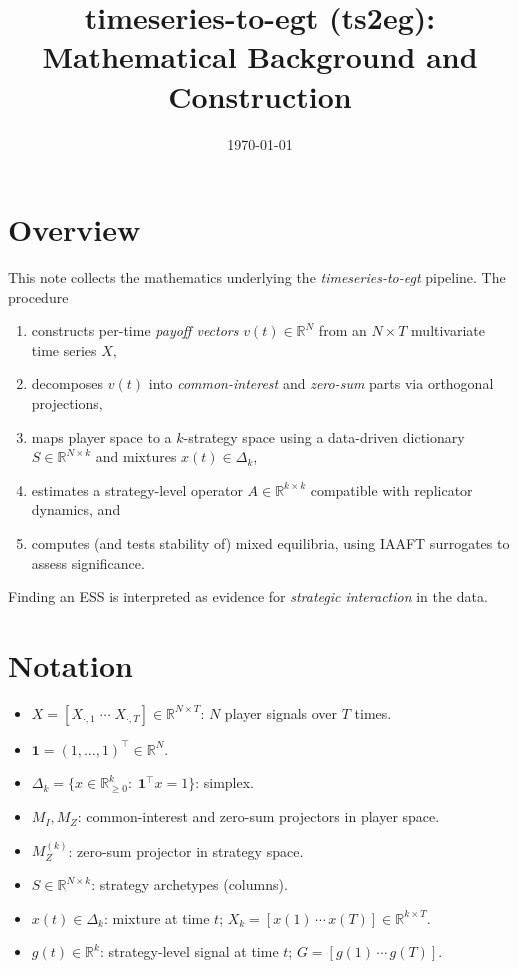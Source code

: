 \documentclass[11pt]{article}
\title{\textbf{timeseries-to-egt (ts2eg):\\
Mathematical Background and Construction}}
\author{}
\date{\today}
\newcommand{\one}{\mathbf{1}}
\newcommand{\R}{\mathbb{R}}
\begin{document}
\maketitle

\section{Overview}
This note collects the mathematics underlying the \emph{timeseries-to-egt} pipeline. The procedure
\begin{enumerate}[leftmargin=*]
    \item constructs per-time \emph{payoff vectors} $v(t)\in\R^N$ from an $N\times T$ multivariate time series $X$,
    \item decomposes $v(t)$ into \emph{common-interest} and \emph{zero-sum} parts via orthogonal projections,
    \item maps player space to a $k$-strategy space using a data-driven dictionary $S\in\R^{N\times k}$ and mixtures $x(t)\in\Delta_k$,
    \item estimates a strategy-level operator $A\in\R^{k\times k}$ compatible with replicator dynamics, and
    \item computes (and tests stability of) mixed equilibria, using IAAFT surrogates to assess significance.
\end{enumerate}
Finding an ESS is interpreted as evidence for \emph{strategic interaction} in the data.

\section{Notation}
\begin{itemize}[leftmargin=*]
\item $X=[X_{\cdot,1}\;\cdots\;X_{\cdot,T}] \in \R^{N\times T}$: $N$ player signals over $T$ times.
\item $\one=(1,\dots,1)^\top\in\R^N$.
\item $\Delta_k = \{x\in\R^k_{\ge 0}:\;\one^\top x = 1\}$: simplex.
\item $M_I, M_Z$: common-interest and zero-sum projectors in player space.
\item $M^{(k)}_Z$: zero-sum projector in strategy space.
\item $S\in\R^{N\times k}$: strategy archetypes (columns).
\item $x(t)\in\Delta_k$: mixture at time $t$; $X_k = [x(1)\,\cdots\,x(T)]\in\R^{k\times T}$.
\item $g(t)\in\R^k$: strategy-level signal at time $t$; $G=[g(1)\,\cdots\,g(T)]$.
\end{itemize}
\end{document}
